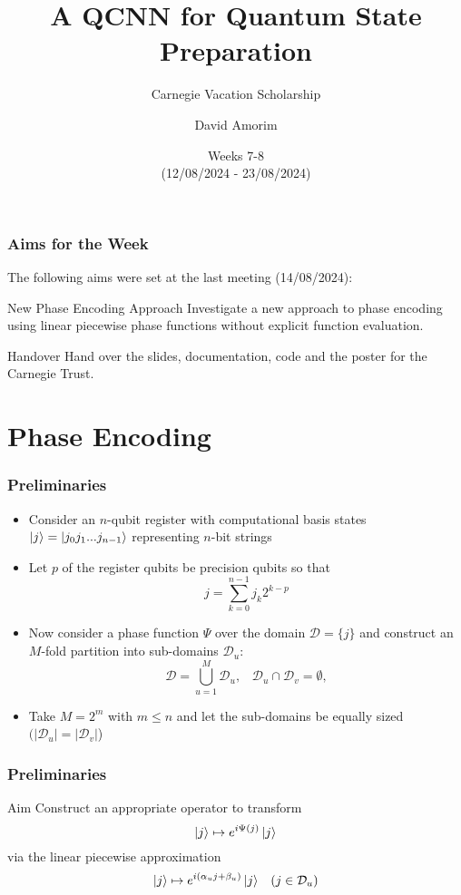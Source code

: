 \documentclass{beamer}
\title[QCNN State Preparation]{A QCNN for Quantum State Preparation}
\subtitle{Carnegie Vacation Scholarship}
\author[David Amorim]{David Amorim}
\institute[]{}
\date[21/08/2024]{Weeks 7-8 \\(12/08/2024 - 23/08/2024)}
\begin{document}
\frame{\titlepage}

\begin{frame}
\frametitle{Aims for the Week}
The following aims were set at the last meeting (14/08/2024):

\begin{alertblock}{New Phase Encoding Approach}
Investigate a new approach to phase encoding using linear piecewise phase functions without explicit function evaluation.  
\end{alertblock}

\begin{alertblock}{Handover}
Hand over the slides, documentation, code and the poster for the Carnegie Trust.
\end{alertblock}
\end{frame}

\section{Phase Encoding}

\begin{frame}
\frametitle{Preliminaries}

\begin{itemize}
\item Consider an \alert{$n$-qubit register} with computational basis states $\ket{j} = \ket{j_0 j_1 ... j_{n-1}}$ representing $n$-bit strings
\item Let \alert{$p$} of the register qubits be \alert{precision qubits} so that 
\begin{equation} 
j = \sum^{n -1}_{k=0} j_k 2^{k-p}
\end{equation}
\item Now consider a \alert{phase function} $\Psi$ over the domain $\mathcal{D} = \{ j \}$ and construct an \alert{$M$-fold partition} into sub-domains $\mathcal{D}_u$:
\begin{equation}
\mathcal{D} = \bigcup_{u=1}^M \mathcal{D}_u, \; \; \; \mathcal{D}_u \cap \mathcal{D}_v = \emptyset, 
\end{equation}
\item Take \alert{$M = 2^m$} with $m \leq n$ and let the sub-domains be equally sized $(|\mathcal{D}_u| = |\mathcal{D}_v|$)
\end{itemize}
\end{frame}

\begin{frame}
\frametitle{Preliminaries}
\begin{alertblock}{Aim}
Construct an appropriate operator to transform 
\begin{equation}
\ket{j} \mapsto e^{i \Psi (j)} \ket{j}
\end{equation}
via the linear piecewise approximation
\begin{equation}
\ket{j} \mapsto e^{i (\alpha_u j + \beta_u)} \ket{j} \; \; \; (j \in \mathcal{D}_u)
\end{equation}
\end{alertblock}
\end{frame}
\end{document}
